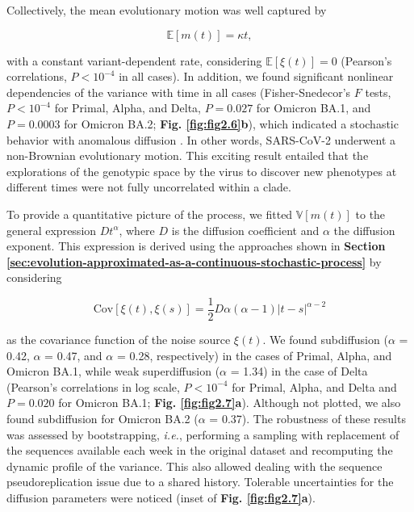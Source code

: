 Collectively, the mean evolutionary motion was well captured by

\begin{equation}
    \mathbb{E}\left[m(t)\right] = \kappa t,
\end{equation}

\noindent with a constant variant-dependent rate, considering $\mathbb{E}\left[\xi (t)\right] = 0$ (Pearson's correlations, $P < 10^{-4}$ in all cases). In addition, we found significant nonlinear dependencies of the variance with time in all cases (Fisher-Snedecor's $F$ tests, $P < 10^{-4}$ for Primal, Alpha, and Delta, $P = 0.027$ for Omicron BA.1, and $P = 0.0003$ for Omicron BA.2; \textbf{Fig. \ref{fig:fig2.6}b}), which indicated a stochastic behavior with anomalous diffusion \cite{manzo2015}. In other words, SARS-CoV-2 underwent a non-Brownian evolutionary motion. This exciting result entailed that the explorations of the genotypic space by the virus to discover new phenotypes at different times were not fully uncorrelated within a clade.

To provide a quantitative picture of the process, we fitted $\mathbb{V}\left[m(t)\right]$ to the general expression $Dt^\alpha$, where $D$ is the diffusion coefficient and $\alpha$ the diffusion exponent. This expression is derived using the approaches shown in \textbf{Section \ref{sec:evolution-approximated-as-a-continuous-stochastic-process}} by considering 

\begin{equation}
    \text{Cov}\left[\xi(t),\xi(s)\right] = \frac{1}{2}D\alpha (\alpha - 1)\left|t - s\right|^{\alpha - 2}
\end{equation}

\noindent as the covariance function of the noise source $\xi(t)$. We found subdiffusion ($\alpha$ = 0.42, $\alpha$ = 0.47, and $\alpha$ = 0.28, respectively) in the cases of Primal, Alpha, and Omicron BA.1, while weak superdiffusion ($\alpha$ = 1.34) in the case of Delta (Pearson's correlations in log scale, $P < 10^{-4}$ for Primal, Alpha, and Delta and $P = 0.020$ for Omicron BA.1; \textbf{Fig. \ref{fig:fig2.7}a}). Although not plotted, we also found subdiffusion for Omicron BA.2 ($\alpha$ = 0.37). The robustness of these results was assessed by bootstrapping, \textit{i.e.}, performing a sampling with replacement of the sequences available each week in the original dataset and recomputing the dynamic profile of the variance. This also allowed dealing with the sequence pseudoreplication issue due to a shared history. Tolerable uncertainties for the diffusion parameters were noticed (inset of \textbf{Fig. \ref{fig:fig2.7}a}).

